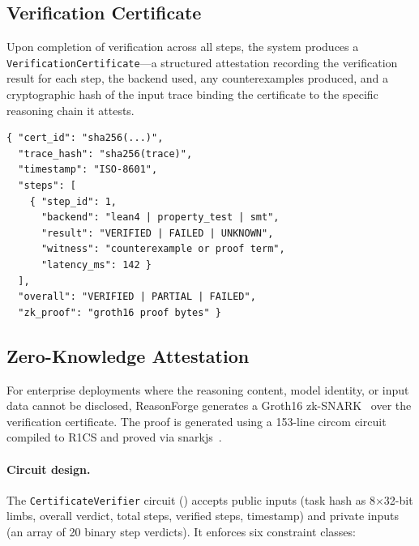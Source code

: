 \documentclass[11pt,a4paper]{article}
\begin{document}
\subsection{Verification Certificate}
\label{sec:certificate}

Upon completion of verification across all steps, the system produces a
\texttt{VerificationCertificate}---a structured attestation recording the
verification result for each step, the backend used, any counterexamples
produced, and a cryptographic hash of the input trace binding the
certificate to the specific reasoning chain it attests.

\begin{lstlisting}[language={},caption={VerificationCertificate schema.},
  label=lst:cert]
{ "cert_id": "sha256(...)",
  "trace_hash": "sha256(trace)",
  "timestamp": "ISO-8601",
  "steps": [
    { "step_id": 1,
      "backend": "lean4 | property_test | smt",
      "result": "VERIFIED | FAILED | UNKNOWN",
      "witness": "counterexample or proof term",
      "latency_ms": 142 }
  ],
  "overall": "VERIFIED | PARTIAL | FAILED",
  "zk_proof": "groth16 proof bytes" }
\end{lstlisting}

\subsection{Zero-Knowledge Attestation}
\label{sec:zk}

For enterprise deployments where the reasoning content, model identity,
or input data cannot be disclosed, ReasonForge generates a Groth16
zk-SNARK~\citep{groth2016size} over the verification certificate.  The
proof is generated using a 153-line circom
circuit~\citep{circom2022} compiled to R1CS and proved via
snarkjs~\citep{snarkjs2022}.

\paragraph{Circuit design.}
The \texttt{CertificateVerifier} circuit () accepts
public inputs (task hash as 8$\times$32-bit limbs, overall verdict,
total steps, verified steps, timestamp) and private inputs (an array of
20 binary step verdicts).  It enforces six constraint classes:
\end{document}
